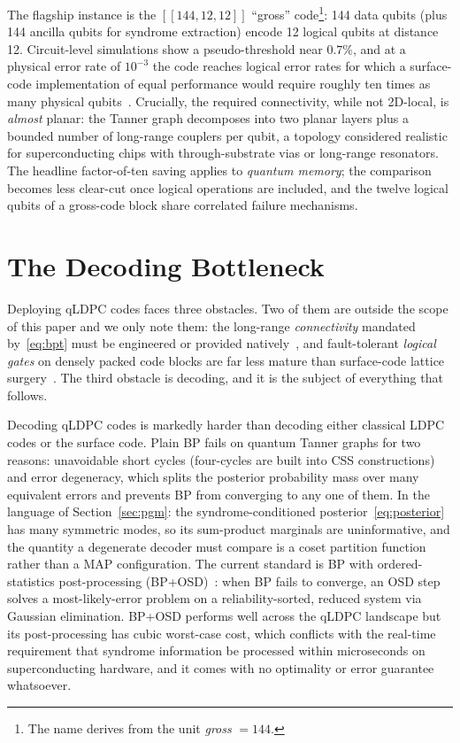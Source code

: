 \documentclass[a4paper,11pt]{quantumarticle}
\theoremstyle{definition}
\begin{document}
The flagship instance is the $[\![144, 12, 12]\!]$ ``gross''
code\footnote{The name derives from the unit \emph{gross} $=144$.}: 144 data
qubits (plus 144 ancilla qubits for syndrome extraction) encode 12 logical
qubits at distance 12. Circuit-level simulations show a pseudo-threshold near
$0.7\%$, and at a physical error rate of $10^{-3}$ the code reaches logical
error rates for which a surface-code implementation of equal performance
would require roughly ten times as many physical qubits~\cite{bravyi2024}.
Crucially, the required connectivity, while not 2D-local, is
\emph{almost} planar: the Tanner graph decomposes into two planar layers plus
a bounded number of long-range couplers per qubit, a topology considered
realistic for superconducting chips with through-substrate vias or
long-range resonators. The headline factor-of-ten saving applies to
\emph{quantum memory}; the comparison becomes less clear-cut once logical
operations are included, and the twelve logical qubits of a gross-code block
share correlated failure mechanisms.

\section{The Decoding Bottleneck}
\label{sec:challenges}
\label{sec:decoding}
Deploying qLDPC codes faces three obstacles. Two of them are outside the
scope of this paper and we only note them: the long-range \emph{connectivity}
mandated by~\eqref{eq:bpt} must be engineered or provided
natively~\cite{bravyi2010, baspin2022, cohen2022, xu2024}, and
fault-tolerant \emph{logical gates} on densely packed code blocks are far
less mature than surface-code lattice surgery~\cite{cohen2022, bravyi2024}.
The third obstacle is decoding, and it is the subject of everything that
follows.

Decoding qLDPC codes is markedly harder than decoding either classical LDPC
codes or the surface code. Plain BP fails on quantum Tanner graphs for two
reasons: unavoidable short cycles (four-cycles are built into CSS
constructions) and error degeneracy, which splits the posterior probability
mass over many equivalent errors and prevents BP from converging to any one
of them. In the language of Section~\ref{sec:pgm}: the syndrome-conditioned
posterior~\eqref{eq:posterior} has many symmetric modes, so its sum-product
marginals are uninformative, and the quantity a degenerate decoder must
compare is a coset partition function rather than a MAP configuration.
The current standard is BP with ordered-statistics post-processing
(BP+OSD)~\cite{panteleev2021bposd, roffe2020}: when BP fails to converge, an
OSD step solves a most-likely-error problem on a reliability-sorted, reduced
system via Gaussian elimination. BP+OSD performs well across the qLDPC
landscape but its post-processing has cubic worst-case cost, which conflicts
with the real-time requirement that syndrome information be processed within
microseconds on superconducting hardware, and it comes with no optimality
or error guarantee whatsoever.
\end{document}
